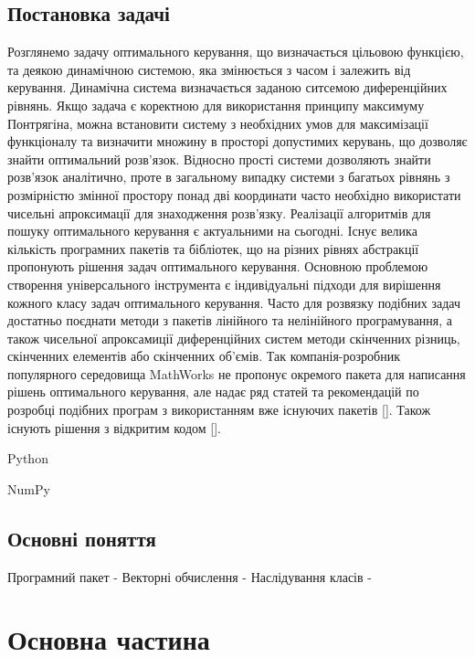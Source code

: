 \documentclass[a4paper,12pt]{extreport}
\begin{document}
\section{Постановка задачі} 
Розглянемо задачу оптимального керування, що визначається цільовою функцією, та деякою динамічною системою, яка змінюється з часом і залежить від
керування. Динамічна система визначається заданою ситсемою диференційних рівнянь. Якщо задача є коректною для використання 
принципу максимуму Понтрягіна, можна
встановити систему з необхідних умов для максимізації функціоналу та визначити
множину в просторі допустимих керувань, що дозволяє знайти оптимальний розв'язок. 
Відносно прості системи дозволяють знайти розв'язок аналітично, проте в загальному випадку системи з багатьох рівнянь 
з розмірністю змінної простору понад дві координати часто необхідно використати чисельні апроксимації для знаходження 
розв'язку. Реалізації алгоритмів для пошуку оптимального керування є актуальними на сьогодні. Існує велика кількість програмних
пакетів та бібліотек, що на різних рівнях абстракції пропонують рішення задач оптимального керування. Основною проблемою 
створення універсального інструмента є індивідуальні підходи для вирішення кожного класу задач оптимального керування.  
Часто для розвязку подібних задач достатньо поєднати методи з пакетів лінійного та нелінійного програмування, а також чисельної 
апроксамиції диференційних систем методи скінченних різниць, скінченних елементів або скінченних об'ємів. Так компанія-розробник 
популярного середовища MathWorks не пропонує окремого пакета для написання рішень оптимального керування, але надає ряд статей 
та рекомендацій по розробці подібних програм з використанням вже існуючих пакетів []. Також існують рішення з відкритим кодом [].

Python

NumPy


\section{Основні поняття}
Програмний пакет - 
Векторні обчислення - 
Наслідування класів - 

\chapter{Основна частина} 
%

\end{document}
